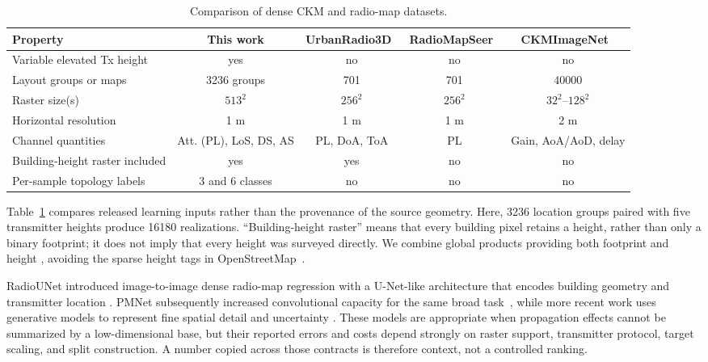 \documentclass[10pt,conference,letterpaper]{IEEEtran}
\begin{document}
\begin{table}[t]
\centering
\caption{Comparison of dense CKM and radio-map datasets.}
\scriptsize
\setlength{\tabcolsep}{4pt}
\begin{tabular}{@{}lcccc@{}}
\toprule
Property & This work & UrbanRadio3D~\cite{radiodiff3d2026} & RadioMapSeer~\cite{dataset2212} & CKMImageNet~\cite{ckmimagenet2025} \\
\midrule
Variable elevated Tx height & yes & no & no & no \\
Layout groups or maps & 3236 groups & 701 & 701 & 40000 \\
Raster size(s) & $513^2$ & $256^2$ & $256^2$ & $32^2$--$128^2$ \\
Horizontal resolution & 1 m & 1 m & 1 m & 2 m \\
Channel quantities & Att. (PL), LoS, DS, AS & PL, DoA, ToA & PL & Gain, AoA/AoD, delay \\
Building-height raster included & yes & yes & no & no \\
Per-sample topology labels & 3 and 6 classes & no & no & no \\
\bottomrule
\end{tabular}
\label{tab:datasets}
\vspace{-8pt}
\end{table}

Table~\ref{tab:datasets} compares released learning inputs rather than the
provenance of the source geometry. Here, 3236 location groups paired with five
transmitter heights produce 16180 realizations. ``Building-height raster''
means that every building pixel retains a height, rather than only a binary
footprint; it does not imply that every height was surveyed directly. We
combine global products providing both footprint and height
\cite{Che2024globfp,Zhu2025atlas}, avoiding the sparse height tags in
OpenStreetMap~\cite{Bernard2022}.

RadioUNet introduced image-to-image dense radio-map regression with a U-Net-like
architecture that encodes building geometry and transmitter location
\cite{radiounet2020}. PMNet subsequently increased convolutional capacity for
the same broad task~\cite{pmnet2023}, while more recent work uses
generative models to represent fine spatial detail and uncertainty
\cite{radiodiff3d2026}. These models are appropriate when propagation effects
cannot be summarized by a low-dimensional base, but their reported errors and
costs depend strongly on raster support, transmitter protocol, target scaling,
and split construction. A number copied across those contracts is therefore
context, not a controlled ranking.
\end{document}
